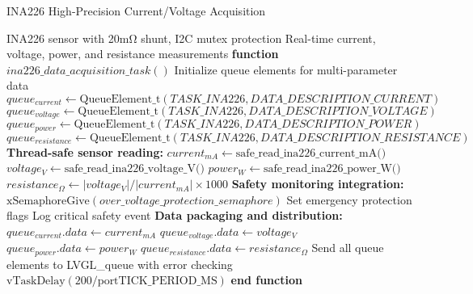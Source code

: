 \documentclass{article}
\begin{document}
\begin{algorithm}
\caption{INA226 High-Precision Current/Voltage Acquisition}
\label{alg:ina226_acquisition}
\begin{algorithmic}[1]
\REQUIRE INA226 sensor with 20mΩ shunt, I2C mutex protection
\ENSURE Real-time current, voltage, power, and resistance measurements
\STATE \textbf{function} $ina226\_data\_acquisition\_task()$
\STATE Initialize queue elements for multi-parameter data
\STATE $queue_{current} \leftarrow \text{QueueElement\_t}(TASK\_INA226, DATA\_DESCRIPTION\_CURRENT)$
\STATE $queue_{voltage} \leftarrow \text{QueueElement\_t}(TASK\_INA226, DATA\_DESCRIPTION\_VOLTAGE)$
\STATE $queue_{power} \leftarrow \text{QueueElement\_t}(TASK\_INA226, DATA\_DESCRIPTION\_POWER)$
\STATE $queue_{resistance} \leftarrow \text{QueueElement\_t}(TASK\_INA226, DATA\_DESCRIPTION\_RESISTANCE)$
\STATE
{}
    \STATE \textbf{Thread-safe sensor reading:}
    \STATE $current_{mA} \leftarrow \text{safe\_read\_ina226\_current\_mA()}$
    \STATE $voltage_{V} \leftarrow \text{safe\_read\_ina226\_voltage\_V()}$
    \STATE $power_{W} \leftarrow \text{safe\_read\_ina226\_power\_W()}$
    \STATE $resistance_{\Omega} \leftarrow |voltage_{V}| / |current_{mA}| \times 1000$
    \STATE
    \STATE \textbf{Safety monitoring integration:}
        \STATE $\text{xSemaphoreGive}(over\_voltage\_protection\_semaphore)$
        \STATE Set emergency protection flags
        \STATE Log critical safety event
    \ENDIF
    \STATE
    \STATE \textbf{Data packaging and distribution:}
    \STATE $queue_{current}.data \leftarrow current_{mA}$
    \STATE $queue_{voltage}.data \leftarrow voltage_{V}$
    \STATE $queue_{power}.data \leftarrow power_{W}$
    \STATE $queue_{resistance}.data \leftarrow resistance_{\Omega}$
    \STATE
    \STATE Send all queue elements to LVGL\_queue with error checking
    \STATE $\text{vTaskDelay}(200 / \text{portTICK\_PERIOD\_MS})$ 
\ENDWHILE
\STATE \textbf{end function}
\end{algorithmic}
\end{algorithm}
\end{document}
